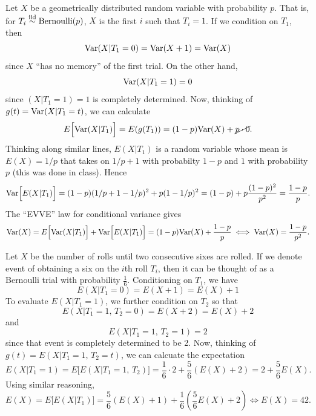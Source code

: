 \documentclass[usenames,dvipsnames]{homework}
\begin{document}
\newpage 


  Let $X$ be a geometrically distributed random variable with probability $p$.  That is, for $T_i \stackrel{\mathrm{iid}}\sim \text{Bernoulli}(p)$, $X$ is the first $i$ such that $T_i = 1$. If we condition on $T_1$, then
  $$
    \mathrm{Var}(X|T_1 = 0) = \mathrm{Var}(X+1) = \mathrm{Var}(X)
  $$
  since $X$ ``has no memory'' of the first trial. On the other hand, 
  $$
    \mathrm{Var}(X|T_1 = 1) = 0
  $$
  since $(X|T_1=1) = 1$ is completely determined.  Now, thinking of $g(t) = \mathrm{Var}(X|T_1=t)$, we can calculate 
  $$
    E\Big[ \mathrm{Var}(X|T_1) \Big] = E(g(T_1)) = (1-p)\mathrm{Var} (X) + \cancel{p\cdot0}.
  $$
  Thinking along similar lines, $E(X|T_1)$ is a random variable whose mean is $E(X) = 1/p$ that takes on $1/p + 1$ with probabilty $1-p$ and $1$ with probability $p$ (this was done in class). Hence
  $$
    \mathrm{Var}\Big[ E(X|T_1) \Big] = (1-p)(1/p + 1 - 1/p)^2 + p(1 - 1/p)^2 = (1-p) + p\frac{(1-p)^2}{p^2} = \frac{1-p}p. 
  $$
  The ``EVVE'' law for conditional variance gives
  $$
    \mathrm{Var}(X) = E\Big[ \mathrm{Var}(X|T_1) \Big] + \mathrm{Var}\Big[ E(X|T_1) \Big] = (1-p)\mathrm{Var}(X) + \frac{1-p}p \iff \mathrm{Var}(X) = \frac{1-p}{p^2}.
  $$

Let $X$ be the number of rolls until two consecutive sixes are rolled.  If we denote event of obtaining a six on the $i$th roll $T_i$, then it can be thought of as a Bernoulli trial with probability $\frac 16$.  Conditioning on $T_1$, we have 
$$
  E(X|T_1 = 0) = E(X+1) = E(X) + 1
$$
To evaluate $E(X|T_1=1)$, we further condition on $T_2$ so that
$$
  E(X|T_1 = 1,\,T_2=0) = E(X+2) = E(X) + 2
$$
and
$$
  E(X|T_1=1,\,T_2=1) = 2
$$
since that event is completely determined to be 2. Now, thinking of $g(t) = E(X|T_1 = 1,\,T_2=t)$, we can calcuate the expectation
$$
  E(X|T_1 = 1) = E\Big[ E(X|T_1=1,\,T_2) \Big] = \frac 16\cdot 2 + \frac 56 (E(X) + 2) = 2 + \frac 56 E(X).
$$
Using similar reasoning,
$$
  E(X) = E\Big[ E(X|T_1) \Big] = \frac 56(E(X) + 1) + \frac16\left(\frac 56 E(X) + 2\right) \iff E(X) = 42.
$$
\end{document}
